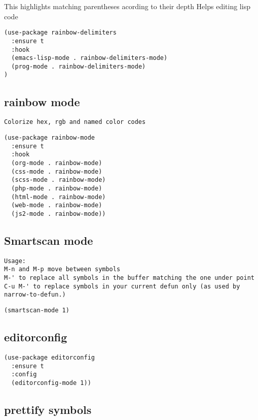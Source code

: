 \documentclass[11pt]{article}
\begin{document}
This highlights matching parentheses acording to their depth
Helps editing lisp code

\begin{verbatim}
(use-package rainbow-delimiters
  :ensure t
  :hook
  (emacs-lisp-mode . rainbow-delimiters-mode)
  (prog-mode . rainbow-delimiters-mode)
)
\end{verbatim}

\subsection*{rainbow mode}
\label{sec:org2f64c5f}

\begin{verbatim}
Colorize hex, rgb and named color codes
\end{verbatim}


\begin{verbatim}
(use-package rainbow-mode
  :ensure t
  :hook
  (org-mode . rainbow-mode)
  (css-mode . rainbow-mode)
  (scss-mode . rainbow-mode)
  (php-mode . rainbow-mode)
  (html-mode . rainbow-mode)
  (web-mode . rainbow-mode)
  (js2-mode . rainbow-mode))
\end{verbatim}

\subsection*{Smartscan mode}
\label{sec:org68855c8}
\begin{verbatim}
Usage:
M-n and M-p move between symbols
M-' to replace all symbols in the buffer matching the one under point
C-u M-' to replace symbols in your current defun only (as used by narrow-to-defun.)
\end{verbatim}


\begin{verbatim}
(smartscan-mode 1)
\end{verbatim}

\subsection*{editorconfig}
\label{sec:orgf19fda1}

\begin{verbatim}
(use-package editorconfig
  :ensure t
  :config
  (editorconfig-mode 1))
\end{verbatim}

\subsection*{prettify symbols}
\label{sec:org646ad31}
\end{document}
